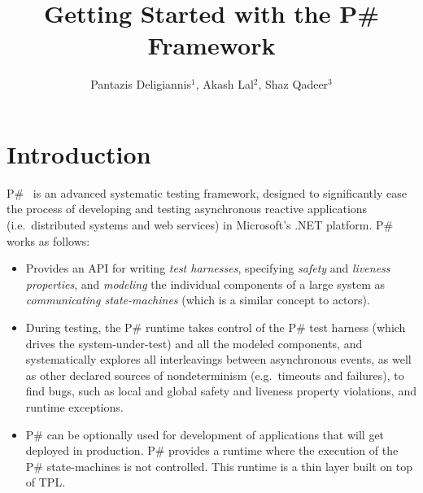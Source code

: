 \documentclass{llncs}
\newcommand{\ps}{P\#\xspace}
\begin{document}
\title{Getting Started with the \ps Framework}

\author{Pantazis Deligiannis$^1$, Akash Lal$^2$, Shaz Qadeer$^3$}

\maketitle

\section{Introduction}
\label{sec:intro}

\ps~\cite{deligiannis2015psharp}\cite{deligiannis2016psharp} is an advanced systematic testing framework, designed to significantly ease the process of developing and testing asynchronous reactive applications (i.e.\ distributed systems and web services) in Microsoft's .NET platform. \ps works as follows:

\begin{itemize}
\item Provides an API for writing \emph{test harnesses}, specifying \emph{safety} and \emph{liveness properties}, and \emph{modeling} the individual components of a large system as \emph{communicating state-machines} (which is a similar concept to actors).

\item During testing, the \ps runtime takes control of the \ps test harness (which drives the system-under-test) and all the modeled components, and systematically explores all interleavings between asynchronous events, as well as other declared sources of nondeterminism (e.g.\ timeouts and failures), to find bugs, such as local and global safety and liveness property violations, and runtime exceptions.

\item \ps can be optionally used for development of applications that will get deployed in production. \ps provides a runtime where the execution of the \ps state-machines is not controlled. This runtime is a thin layer built on top of TPL.
\end{itemize}
\end{document}
